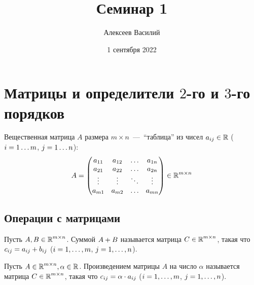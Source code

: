 \documentclass[a4paper,12pt]{article}
\author{Алексеев Василий}
\title{Семинар 1}
\date{1 сентября 2022}
\begin{document}
  \maketitle
  
  \tableofcontents

  \thispagestyle{empty}
  
  \newpage
  


  \section{Матрицы и определители $2$-го и $3$-го порядков}

  Вещественная матрица $A$ размера $m \times n$~---~``таблица'' из чисел $a_{ij} \hm\in \RR$ ($i \hm= 1 \ldots m$, $j \hm= 1 \ldots n$):
  \[
    A = \begin{pmatrix}
      a_{11} & a_{12} & \ldots & a_{1n}\\
      a_{21} & a_{22} & \ldots & a_{2n}\\
      \vdots & \vdots & \ddots & \vdots\\
      a_{m1} & a_{m2} & \ldots & a_{mn}
    \end{pmatrix} \in \operatorname{\mathbb R}^{m \times n}
  \]
  
  
  \subsection{Операции с матрицами}
  
  \begin{definition}
    Пусть $A, B \in \operatorname{\mathbb R}^{m \times n}$.
    Суммой $A \hm+ B$ называется матрица $C \hm\in \RR^{m \times n}$, такая что
    $c_{ij} \hm= a_{ij} + b_{ij}$ ($i \hm= 1, \ldots, m$, $j \hm= 1, \ldots, n$).
  \end{definition}
  
  \begin{definition}
    Пусть $A \in \operatorname{\mathbb R}^{m \times n}, \alpha \in \operatorname{\mathbb R}$.
    Произведением матрицы $A$ на число $\alpha$ называется матрица $C \hm\in \RR^{m \times n}$, такая что
    $c_{ij} \hm= \alpha \cdot a_{ij}$ ($i \hm= 1, \ldots, m$, $j \hm= 1, \ldots, n$).
  \end{definition}
  
\end{document}
